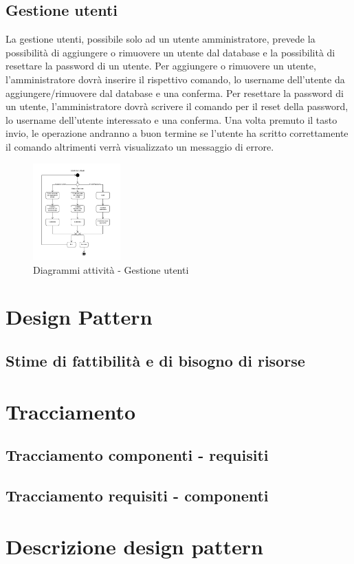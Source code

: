 \documentclass{scalatekids-article}
\begin{document}
\subsection{Gestione utenti}
La gestione utenti, possibile solo ad un utente amministratore, prevede la possibilità di aggiungere o rimuovere un utente dal database e la possibilità di resettare la password di un utente.
Per aggiungere o rimuovere un utente, l'amministratore dovrà inserire il rispettivo comando, lo username dell'utente da aggiungere/rimuovere dal database e una conferma.
Per resettare la password di un utente, l'amministratore dovrà scrivere il comando per il reset della password, lo username dell'utente interessato e una conferma.
Una volta premuto il tasto invio, le operazione andranno a buon termine se l'utente ha scritto correttamente il comando altrimenti verrà visualizzato un messaggio di errore.

\begin{figure}[H]
	\begin{center}
		\includegraphics[width=0.3\textwidth, keepaspectratio]{img/diagrammiAttivita/gestioneUtenti.jpeg}
		\caption{Diagrammi attività - Gestione utenti}
	\end{center}
\end{figure}

\section{Design Pattern}

\subsection{Stime di fattibilità e di bisogno di risorse}

\section{Tracciamento}

\subsection{Tracciamento componenti - requisiti}

\subsection{Tracciamento requisiti - componenti}

\appendix
\section{Descrizione design pattern}
\listoftables
\listoffigures
\end{document}
